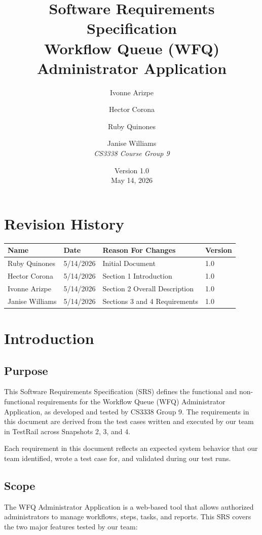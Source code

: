\documentclass[12pt]{article}
\title{Software Requirements Specification\\
\large Workflow Queue (WFQ) Administrator Application}
\author{Ivonne Arizpe \and Hector Corona \and Ruby Quinones \and Janise Williams\\[0.5em]
\textit{CS3338 Course Group 9}}
\date{Version 1.0 \\ May 14, 2026}
\begin{document}
 
\maketitle  
\newpage
\tableofcontents
\newpage
 
\section*{Revision History}
\begin{center}
\begin{tabular}{llll}
\toprule
Name & Date & Reason For Changes & Version \\
\midrule
Ruby Quinones & 5/14/2026 & Initial Document & 1.0 \\
Hector Corona & 5/14/2026 & Section 1 Introduction & 1.0 \\
Ivonne Arizpe & 5/14/2026 & Section 2 Overall Description & 1.0 \\
Janise Williams & 5/14/2026 & Sections 3 and 4 Requirements & 1.0 \\
\bottomrule
\end{tabular}
\end{center}
\newpage
 
\section{Introduction}
 
\subsection{Purpose}
This Software Requirements Specification (SRS) defines the functional and non-functional
requirements for the Workflow Queue (WFQ) Administrator Application, as developed and
tested by CS3338 Group 9. The requirements in this document are derived from the test cases
written and executed by our team in TestRail across Snapshots 2, 3, and 4.
 
Each requirement in this document reflects an expected system behavior that our team
identified, wrote a test case for, and validated during our test runs.
 
\subsection{Scope}
The WFQ Administrator Application is a web-based tool that allows authorized administrators
to manage workflows, steps, tasks, and reports. This SRS covers the two major features
tested by our team:
 
\end{document}
